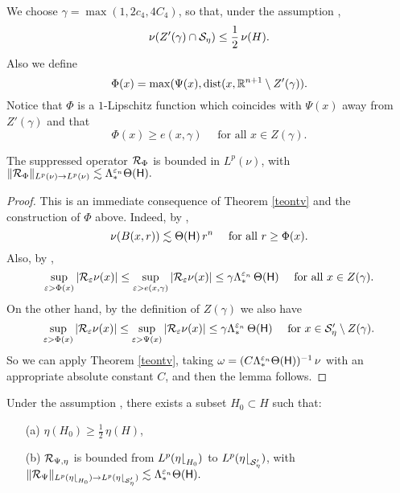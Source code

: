 We choose $\gamma=\max(1,2c_4,4C_4)$, so that, under the assumption  ,
\begin{equation}\label{eqnugam*}
\nu(Z'(\gamma)\cap {\mathcal S}_\eta) \leq \frac12\,\nu(H).
\end{equation}
Also we define
$$\Phi(x) = \max(\Psi(x),{\rm dist}(x,{\mathbb R}^{n+1}\setminus Z'(\gamma)).$$
Notice that $\Phi$ is a $1$-Lipschitz function which coincides with $\Psi(x)$ away from $Z'(\gamma)$ and
that 
\begin{equation}\label{eqphigam}
\Phi(x)\geq e(x,\gamma)\quad \mbox{ for all $x\in Z(\gamma)$.}
\end{equation}


\vv

\begin{lemma}\label{lemrieszphi4}
The suppressed operator ${\mathcal R}_\Phi$ is bounded in $L^p(\nu)$, with
$\|{\mathcal R}_\Phi\|_{L^p(\nu)\to L^p(\nu)}\lesssim \Lambda_*^{{\varepsilon}_n}\Theta({\mathsf{H}}).$
\end{lemma}

\begin{proof}
This is an immediate consequence of Theorem \ref{teontv} and the construction of $\Phi$ above.
Indeed, by ,
$$\nu(B(x,r)) \lesssim \Theta({\mathsf{H}})\,r^n \quad\mbox{ for all $r\geq\Phi(x)$.}$$
Also, by ,
$$\sup_{{\varepsilon}>\Phi(x)}|{\mathcal R}_{\varepsilon}\nu(x)|\leq \sup_{{\varepsilon}>e(x,\gamma)}|{\mathcal R}_{\varepsilon}\nu(x)|
\leq \gamma \Lambda_*^{{\varepsilon}_n}\,\Theta({\mathsf{H}})
\quad \mbox{ for all $x\in Z(\gamma)$.}$$
On the other hand, by the definition of $Z(\gamma)$ we also have
$$\sup_{{\varepsilon}>\Phi(x)}|{\mathcal R}_{\varepsilon}\nu(x)|\leq \sup_{{\varepsilon}>\Psi(x)}|{\mathcal R}_{\varepsilon}\nu(x)|\leq
\gamma \Lambda_*^{{\varepsilon}_n}\,\Theta({\mathsf{H}}) \quad \mbox{ for $x\in {\mathcal S}_\eta'\setminus Z(\gamma)$.} 
$$
So we can apply Theorem \ref{teontv}, taking 
$\omega= (C\Lambda_*^{{\varepsilon}_n}\Theta({\mathsf{H}}))^{-1}\,\nu$ with an appropriate absolute constant $C$, and
then the lemma follows.
\end{proof}

\vv

\begin{lemma}\label{lemH0}
Under the assumption ,
there exists a subset $H_0\subset H$ such that:
\begin{itemize}
\item[(a)] $\eta(H_0)\geq \frac12\,\eta(H)$,
\item[(b)] ${\mathcal R}_{\Psi,\eta}$ is bounded from $L^p(\eta{\lfloor}_{H_0})$ to $L^p(\eta{\lfloor}_{{\mathcal S}'_\eta})$, with 
$\|{\mathcal R}_\Psi\|_{L^p(\eta{\lfloor}_{H_0})\to L^p(\eta{\lfloor}_{{\mathcal S}'_\eta})}\lesssim \Lambda_*^{{\varepsilon}_n}\Theta({\mathsf{H}}).$
\end{itemize}
\end{lemma}


